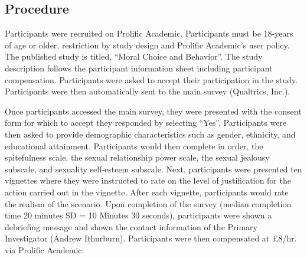 \documentclass[
  donotrepeattitle,doc, 12pt, a4paper,floatsintext]{apa7}
\begin{document}
\hypertarget{procedure-1}{%
\subsection{Procedure}\label{procedure-1}}

Participants were recruited on Prolific Academic. Participants must be 18-years of age or older, restriction by study design and Prolific Academic's user policy. The published study is titled, ``Moral Choice and Behavior''. The study description follows the participant information sheet including participant compensation. Participants were asked to accept their participation in the study. Participants were then automatically sent to the main survey (Qualtrics, Inc.).

Once participants accessed the main survey, they were presented with the consent form for which to accept they responded by selecting ``Yes''. Participants were then asked to provide demographic characteristics such as gender, ethnicity, and educational attainment. Participants would then complete in order, the spitefulness scale, the sexual relationship power scale, the sexual jealousy subscale, and sexuality self-esteem subscale. Next, participants were presented ten vignettes where they were instructed to rate on the level of justification for the action carried out in the vignette. After each vignette, participants would rate the realism of the scenario. Upon completion of the survey (median completion time 20 minutes SD = 10 Minutes 30 seconds), participants were shown a debriefing message and shown the contact information of the Primary Investigator (Andrew Ithurburn). Participants were then compensated at £8/hr. via Prolific Academic.
\end{document}

